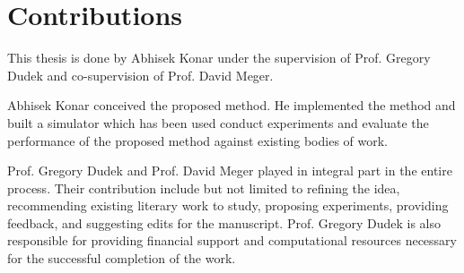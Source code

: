 \chapter*{\rm\bfseries Contributions}
This thesis is done by Abhisek Konar under the supervision of Prof. Gregory Dudek and co-supervision of Prof. David Meger.  
\par
Abhisek Konar conceived the proposed method. He implemented the method and built a simulator which has been used conduct experiments and evaluate the performance of the proposed method against existing bodies of work.
\par
Prof. Gregory Dudek and Prof. David Meger played in integral part in the entire process. Their contribution include but not limited to refining the idea, recommending existing literary work to study, proposing experiments, providing feedback, and suggesting edits for the manuscript. Prof. Gregory Dudek is also responsible for providing financial support and computational resources necessary for the successful completion of the work. 

